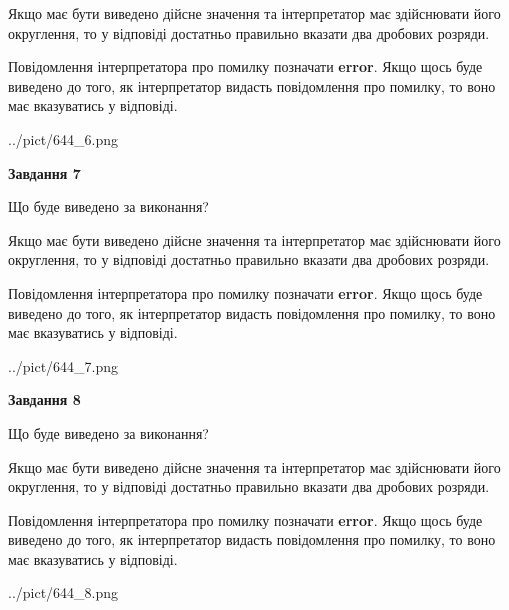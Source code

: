 \documentclass[12pt, ukrainian]{article}
\begin{document}
{\begin {Large}
Якщо має бути виведено дійсне значення та інтерпретатор має здійснювати його округлення, 
то у відповіді достатньо правильно вказати два дробових розряди.

Повідомлення інтерпретатора про помилку позначати \textbf{error}.
Якщо щось буде виведено до того, як інтерпретатор видасть повідомлення про помилку, 
то воно має вказуватись у відповіді. \par

\begin{center}
	{../pict/644_6.png}
\end{center}
\newpage

{\begin {center}\textbf{Завдання 7}\end {center}}\par
Що буде виведено за виконання? \par

Якщо має бути виведено дійсне значення та інтерпретатор має здійснювати його округлення, 
то у відповіді достатньо правильно вказати два дробових розряди.

Повідомлення інтерпретатора про помилку позначати \textbf{error}.
Якщо щось буде виведено до того, як інтерпретатор видасть повідомлення про помилку, 
то воно має вказуватись у відповіді. \par

\begin{center}
	{../pict/644_7.png}
\end{center}
\newpage

{\begin {center}\textbf{Завдання 8}\end {center}}\par
Що буде виведено за виконання? \par

Якщо має бути виведено дійсне значення та інтерпретатор має здійснювати його округлення, 
то у відповіді достатньо правильно вказати два дробових розряди.

Повідомлення інтерпретатора про помилку позначати \textbf{error}.
Якщо щось буде виведено до того, як інтерпретатор видасть повідомлення про помилку, 
то воно має вказуватись у відповіді. \par

\begin{center}
	{../pict/644_8.png}
\end{center}
\newpage


\end{Large}}
\end{document}
